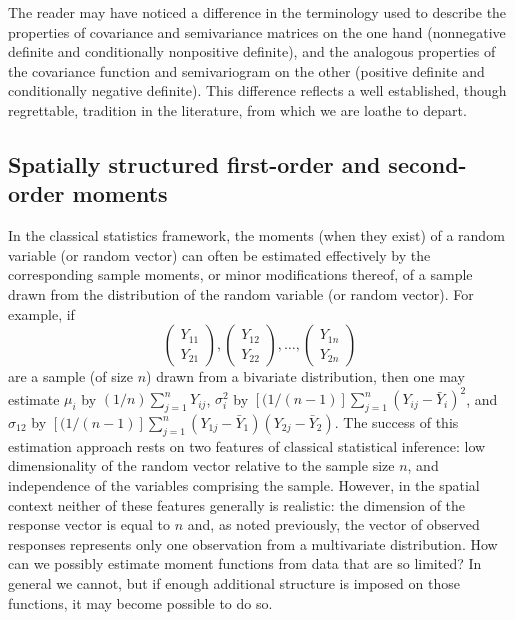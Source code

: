The reader may have noticed a difference in the terminology used to describe the properties of covariance and semivariance matrices on the one hand (nonnegative definite and conditionally nonpositive definite), and the analogous properties of the covariance function and semivariogram on the other (positive definite and conditionally negative definite).  This difference reflects a well established, though regrettable, tradition in the literature, from which we are loathe to depart.  


\subsection{Spatially structured first-order and second-order moments}

In the classical statistics framework, the moments (when they exist) of a random variable (or random vector) can often be estimated effectively by the corresponding sample moments, or minor modifications thereof, of a sample drawn from the distribution of the random variable (or random vector).  For example, if
\[ \left(\begin{array}{c}Y_{11} \\ Y_{21} \end{array}\right),\left(\begin{array}{c}Y_{12} \\ Y_{22}\end{array}\right),\ldots,\left(\begin{array}{c}Y_{1n} \\ Y_{2n}\end{array}\right) \]
are a sample (of size $n$) drawn from a bivariate distribution, then one may estimate $\mu_i$ by $(1/n)\sum_{j=1}^{n}Y_{ij}$, $\sigma_i^2$ by $[(1/(n-1)]\sum_{j=1}^{n}(Y_{ij}-\bar{Y}_{i})^2$, and $\sigma_{12}$ by $[(1/(n-1)]\sum_{j=1}^{n}(Y_{1j}-\bar{Y}_{1})(Y_{2j}-\bar{Y}_2)$.  The success of this estimation approach rests on two features of classical statistical inference: low dimensionality of the random vector relative to the sample size $n$, and independence of the variables comprising the sample.  However, in the spatial context neither of these features generally is realistic: the dimension of the response vector is equal to $n$ and, as noted previously, the vector of observed responses represents only one observation from a multivariate distribution.  How can we possibly estimate moment functions from data that are so limited?  In general we cannot, but if enough additional structure is imposed on those functions, it may become possible to do so.

